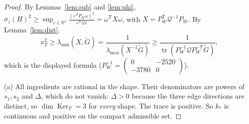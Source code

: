 \documentclass[11pt]{article}
\theoremstyle{remark}
\begin{document}
\begin{proof}
By Lemmas~\ref{lem:sub} and \ref{lem:phi}, $\sigma_z(H)^2\ge\sup_{c\in\mathbb R^2}\frac{(c^{\mathsf T}P_W\omega)^2}{c^{\mathsf T}\mathcal Qc}=\omega^{\mathsf T}X\omega$,
with $X=P_W^{\mathsf T}\mathcal Q^{-1}P_W$. By Lemma~\ref{lem:dist},
\[
\kappa_T^2\ge\lambda_{\min}(X,\tilde G)=\frac1{\lambda_{\max}(X^{-1}\tilde G)}\ge\frac1{\operatorname{tr}(P_W^{-1}\mathcal QP_W^{-\mathsf T}\tilde G)},
\]
which is the displayed formula ($P_W^{-1}=\left(\begin{smallmatrix}0&-2520\\-3780&0\end{smallmatrix}\right)$).

(a) All ingredients are rational in the shape. Their denominators are powers of $s_1,s_2$ and $\Delta$, which do not vanish:
$\Delta>0$ because the three edge directions are distinct, so $\dim\operatorname{Ker}_T=3$ for \emph{every} shape. The trace is positive. So
$k_\ast$ is continuous and positive on the compact admissible set.


\end{proof}
\end{document}
